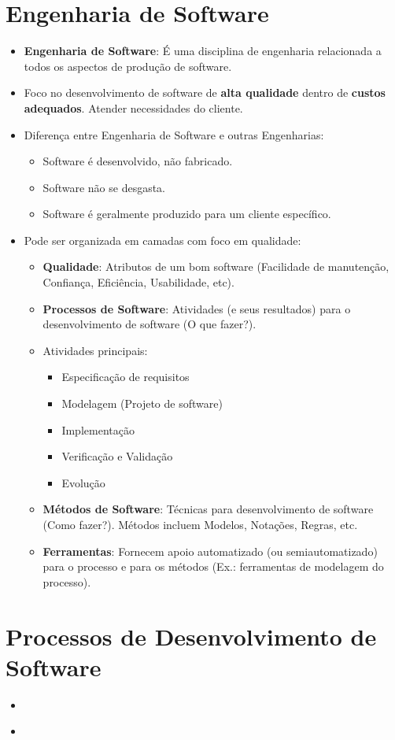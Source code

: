 \documentclass[a4paper, 11pt]{article}
\begin{document}
\section{Engenharia de Software}
\begin{itemize}
	\item \textbf{Engenharia de Software}: É uma disciplina de engenharia relacionada a todos os aspectos de produção de software.
	\item Foco no desenvolvimento de software de \textbf{alta qualidade} dentro de \textbf{custos adequados}. Atender necessidades do cliente.		
	
	\item Diferença entre Engenharia de Software e outras Engenharias:
	\begin{itemize}
		\item Software é desenvolvido, não fabricado.
		\item Software não se desgasta.
		\item Software é geralmente produzido para um cliente específico.
	\end{itemize}
	
	\item Pode ser organizada em camadas com foco em qualidade:
	\begin{itemize}
		\item \textbf{Qualidade}: Atributos de um bom software (Facilidade de manutenção, Confiança, Eficiência, Usabilidade, etc).
		
		\item \textbf{Processos de Software}: Atividades (e seus resultados) para o desenvolvimento de software (O que fazer?).
		\item Atividades principais:
		\begin{itemize}
			\item Especificação de requisitos
			\item Modelagem (Projeto de software)
			\item Implementação
			\item Verificação e Validação
			\item Evolução
		\end{itemize}
		
		\item \textbf{Métodos de Software}: Técnicas para desenvolvimento de software (Como fazer?). Métodos incluem Modelos, Notações, Regras, etc.
		
		\item \textbf{Ferramentas}: Fornecem apoio automatizado (ou semiautomatizado) para o processo e para os métodos (Ex.: ferramentas de modelagem do processo).
	\end{itemize}
\end{itemize}


\section{Processos de Desenvolvimento de Software}
\begin{itemize}
	\item %
\end{itemize}


	\item \textbf{}
	\item \textbf{}
	\item \textbf{}
	
	
	\begin{itemize}
		\item
	\end{itemize}
\end{document}
